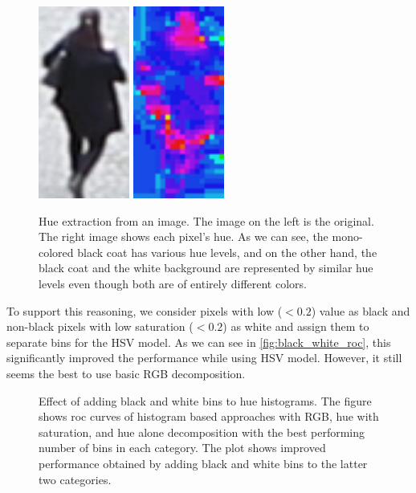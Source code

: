 \begin{figure}
    \centering
    \includegraphics[width=3cm]{img/bad_hue_orig.png}
    \includegraphics[width=3cm]{img/bad_hue_hue.png}
    \caption[Hue extraction from an image]{Hue extraction from an image. The image on the left is the original. The right image shows each pixel's hue. As we can see, the mono-colored black coat has various hue levels, and on the other hand, the black coat and the white background are represented by similar hue levels even though both are of entirely different colors.}
    \label{fig:bad_hue}
\end{figure}

To support this reasoning, we consider pixels with low ($< 0.2$)
value as black and non-black pixels with low saturation ($< 0.2$) as white and
assign them to separate bins for the HSV model. As we can see in \autoref{fig:black_white_roc}, this
significantly improved the performance while using HSV model. However, it still seems the best to use basic RGB decomposition.

\begin{figure}
    \centering
    \def\svgwidth{\columnwidth}
    
    \caption[Effect of adding black and white bins to the hue histograms]{Effect of adding black and white bins to hue histograms. The figure shows \gls{roc} curves of histogram based approaches with RGB, hue with saturation, and hue alone decomposition with the best performing number of bins in each category. The plot shows improved performance obtained by adding black and white bins to the latter two categories.}
    \label{fig:black_white_roc}
\end{figure}

